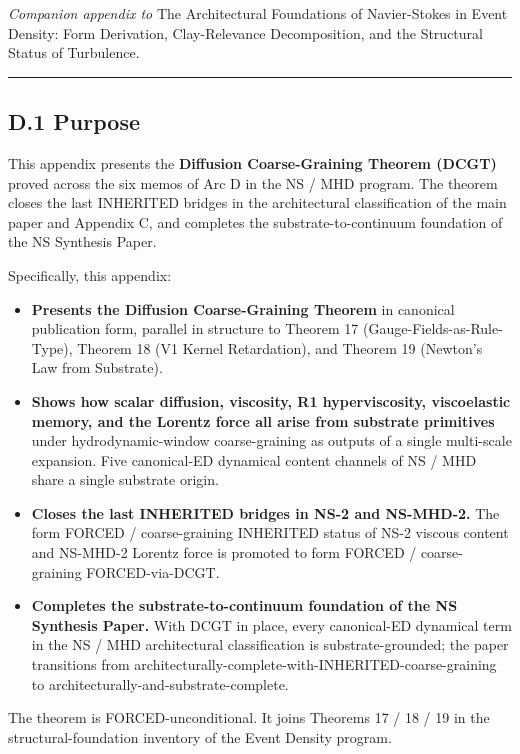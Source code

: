 \documentclass[
  11pt,a4paper]{article}
\providecommand{\tightlist}{%
  \setlength{\itemsep}{0pt}\setlength{\parskip}{0pt}}
\begin{document}
\emph{Companion appendix to} The Architectural Foundations of
Navier-Stokes in Event Density: Form Derivation, Clay-Relevance
Decomposition, and the Structural Status of Turbulence.

\begin{center}\rule{0.5\linewidth}{0.5pt}\end{center}

\subsection{D.1 Purpose}\label{d.1-purpose}

This appendix presents the \textbf{Diffusion Coarse-Graining Theorem
(DCGT)} proved across the six memos of Arc D in the NS / MHD program.
The theorem closes the last INHERITED bridges in the architectural
classification of the main paper and Appendix C, and completes the
substrate-to-continuum foundation of the NS Synthesis Paper.

Specifically, this appendix:

\begin{itemize}
\tightlist
\item
  \textbf{Presents the Diffusion Coarse-Graining Theorem} in canonical
  publication form, parallel in structure to Theorem 17
  (Gauge-Fields-as-Rule-Type), Theorem 18 (V1 Kernel Retardation), and
  Theorem 19 (Newton's Law from Substrate).
\item
  \textbf{Shows how scalar diffusion, viscosity, R1 hyperviscosity,
  viscoelastic memory, and the Lorentz force all arise from substrate
  primitives} under hydrodynamic-window coarse-graining as outputs of a
  single multi-scale expansion. Five canonical-ED dynamical content
  channels of NS / MHD share a single substrate origin.
\item
  \textbf{Closes the last INHERITED bridges in NS-2 and NS-MHD-2.} The
  form FORCED / coarse-graining INHERITED status of NS-2 viscous content
  and NS-MHD-2 Lorentz force is promoted to form FORCED /
  coarse-graining FORCED-via-DCGT.
\item
  \textbf{Completes the substrate-to-continuum foundation of the NS
  Synthesis Paper.} With DCGT in place, every canonical-ED dynamical
  term in the NS / MHD architectural classification is
  substrate-grounded; the paper transitions from
  architecturally-complete-with-INHERITED-coarse-graining to
  architecturally-and-substrate-complete.
\end{itemize}

The theorem is FORCED-unconditional. It joins Theorems 17 / 18 / 19 in
the structural-foundation inventory of the Event Density program.
\end{document}
